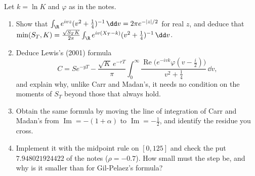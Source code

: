 \begin{exercise}\label{ex:sv-lewis}
\hard Let $k=\ln K$ and $\varphi$ as in the notes.
\begin{enumerate}[label=(\alph*)]
  \item Show that $\int_\R e^{ivz}(v^2+\frac14)^{-1}\,\dd v=2\pi e^{-|z|/2}$ for real $z$, and deduce that
    $\min(S_T,K)=\frac{\sqrt{S_TK}}{2\pi}\int_\R e^{iv(X_T-k)}(v^2+\frac14)^{-1}\,\dd v$.
  \item Deduce Lewis's (2001) formula
    \[
      C=Se^{-yT}-\frac{\sqrt K\,e^{-rT}}{\pi}\int_0^\infty\frac{\operatorname{Re}\big(e^{-ivk}\varphi(v-\frac i2)\big)}{v^2+\frac14}\,\dd v,
    \]
    and explain why, unlike Carr and Madan's, it needs no condition on the moments of $S_T$ beyond those that
    always hold.
  \item Obtain the same formula by moving the line of integration of Carr and Madan's  from
    $\operatorname{Im}=-(1+\alpha)$ to $\operatorname{Im}=-\frac12$, and identify the residue you cross.
  \item Implement it with the midpoint rule on $[0,125]$ and check the put $7.948021924422$ of the notes
    ($\rho=-0.7$). How small must the step be, and why is it smaller than for Gil-Pelaez's formula?
\end{enumerate}
\end{exercise}

